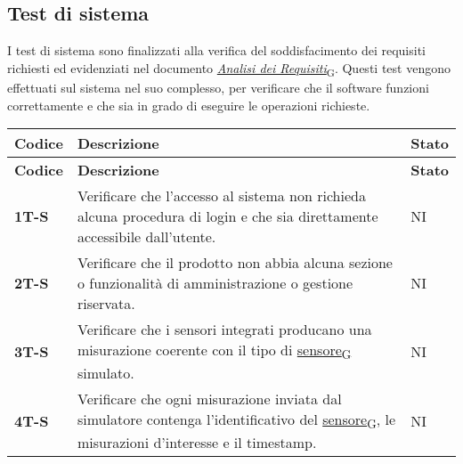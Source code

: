 \subsection{Test di sistema}
I test di sistema sono finalizzati alla verifica del soddisfacimento dei requisiti richiesti ed evidenziati nel documento \href{https://7last.github.io/docs/rtb/documentazione-esterna/analisi-dei-requisiti}{\href{https://7last.github.io/docs/rtb/documentazione-interna/glossario\#analisi-dei-requisiti}{\textit{Analisi dei Requisiti}\textsubscript{G}}}. Questi test vengono effettuati sul sistema nel suo complesso, per verificare che il software funzioni correttamente e che sia in grado di eseguire le operazioni richieste. \\
\begin{longtable}{|>{\raggedright\arraybackslash}m{}|>{\raggedright\arraybackslash}m{}|>{\raggedright\arraybackslash}m{}|}
	\hline
	\textbf{Codice} & \textbf{Descrizione}                                                                                                                                                                             & \textbf{Stato} \\
	\hline
	\endfirsthead
	\hline
	\textbf{Codice} & \textbf{Descrizione}                                                                                                                                                                             & \textbf{Stato} \\
	\endhead
	\textbf{1T-S}   & Verificare che l'accesso al sistema non richieda alcuna procedura di login e che sia direttamente accessibile dall'utente.                                                                       & NI             \\
	\hline
	\textbf{2T-S}   & Verificare che il prodotto non abbia alcuna sezione o funzionalità di amministrazione o gestione riservata.                                                                                      & NI             \\
	\hline
	\textbf{3T-S}   & Verificare che i sensori integrati producano una misurazione coerente con il tipo di \href{https://7last.github.io/docs/rtb/documentazione-interna/glossario\#sensore}{sensore\textsubscript{G}} simulato.                                                                                           & NI             \\
	\hline
	\textbf{4T-S}   & Verificare che ogni misurazione inviata dal simulatore contenga l’identificativo del \href{https://7last.github.io/docs/rtb/documentazione-interna/glossario\#sensore}{sensore\textsubscript{G}}, le misurazioni d'interesse e il timestamp.                                                         & NI             \\

\end{longtable}

